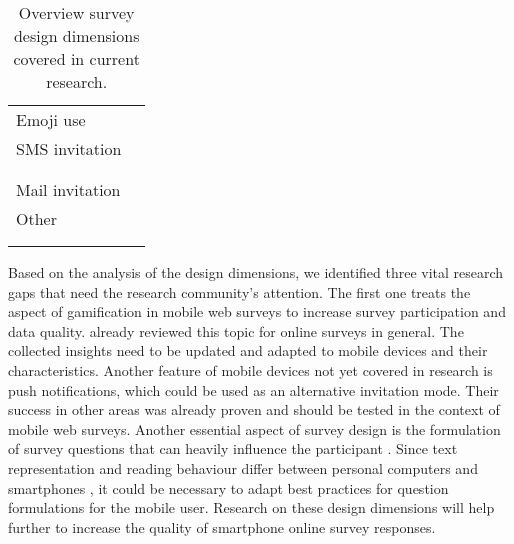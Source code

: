 \begin{table}
\begin{tabular}{ll}
    	Emoji  use & \cite{bacon_how_2017, bosch_using_2021}\\
    	SMS invitation & \cite{de_bruijne_comparing_2013, mavletova_data_2013}\\
    	& \cite{bucher_exploring_2021, de_bruijne_improving_2014}\\
    	& \cite{schlosser_mobile_2018, mavletova_mobile_2014}\\
    	Mail invitation & \cite{lugtig_recruiting_2019}\\
    	Other & \cite{antoun_effects_2017, wang_experimentation_2017}\\
    	& \cite{krebs_exploring_2021, mavletova_grouping_2016}\\
    	& \cite{maineri_slider_2021, revilla_testing_2018}\\
		\bottomrule 
	\end{tabular}
	\caption{Overview survey design dimensions covered in current research.}
	\label{tab: design}
\end{table}

Based on the analysis of the design dimensions, we identified three vital research gaps that need the research community's attention. The first one treats the aspect of gamification in mobile web surveys to increase survey participation and data quality. \cite{keusch_review_2015} already reviewed this topic for online surveys in general. The collected insights need to be updated and adapted to mobile devices and their characteristics. Another feature of mobile devices not yet covered in research is push notifications, which could be used as an alternative invitation mode. Their success in other areas was already proven \cite{stroud_effects_2019, pham_effects_2016} and should be tested in the context of mobile web surveys. Another essential aspect of survey design is the formulation of survey questions that can heavily influence the participant \cite{tourangeau_psychology_2000, groves_survey_2009}. Since text representation and reading behaviour differ between personal computers and smartphones \cite{liu_reading_2016}, it could be necessary to adapt best practices for question formulations for the mobile user. Research on these design dimensions will help further to increase the quality of smartphone online survey responses.  